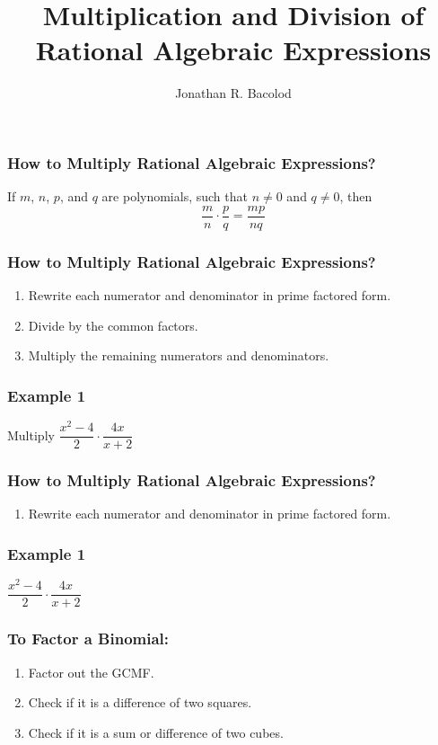 \documentclass[14pt]{beamer}
\title[] {Multiplication and Division of Rational Algebraic Expressions}
\author{Jonathan R. Bacolod}
\institute[SHS]{Sauyo High School}
\date{}
\begin{document}
	\frame{\titlepage}
	
	\begin{frame}
		\frametitle{How to Multiply Rational Algebraic Expressions?}
		If $ m $, $ n $, $ p $, and $ q $ are polynomials, such that $ n \neq 0 $ and $ q \neq 0 $, then \[ \dfrac{m}{n} \cdot \dfrac{p}{q} = \dfrac{mp}{nq} \]
	\end{frame}

    \begin{frame}
    	\frametitle{How to Multiply Rational Algebraic Expressions?}
    	\begin{enumerate}
    		\item<1-> Rewrite each numerator and denominator in prime factored form.
    		\item<2-> Divide by the common factors.
    		\item<3-> Multiply the remaining numerators and denominators.
       	\end{enumerate}
    \end{frame}
    
    \begin{frame}
    	\frametitle{Example 1}
    	Multiply $\dfrac{x^2 - 4}{2} \cdot \dfrac{4x}{x + 2}$
    \end{frame}

    \begin{frame}
    	\frametitle{How to Multiply Rational Algebraic Expressions?}
    	\begin{enumerate}
    		\item Rewrite each numerator and denominator in prime factored form.
    	\end{enumerate}
    \end{frame}

    \begin{frame}
    	\frametitle{Example 1}
    	$\dfrac{x^2 - 4}{2} \cdot \dfrac{4x}{x + 2}$
    \end{frame}

    \begin{frame}
    	\frametitle{To Factor a Binomial:}
    	\begin{enumerate}
    		\item<1-> Factor out the GCMF.
    		\item<2-> Check if it is a difference of two squares.
    		\item<3-> Check if it is a sum or difference of two cubes.
    	\end{enumerate}
    \end{frame}
\end{document}
